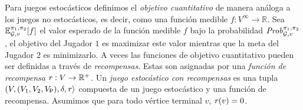 
Para juegos estocásticos definimos el \emph{objetivo cuantitativo} de manera análoga a los juegos no estocásticos, es decir, como una función medible $f: V^{\infty} \to \mathbb{R}$.   Sea $\mathbb{E}^{\pi_{1}, \pi_{2}}_{\mathcal{G},v}[f]$ el valor esperado de la función medible $f$ bajo la probabilidad $\mathit{Prob}^{\pi_{1}, \pi_{2}}_{\mathcal{G},v}$, el objetivo del Jugador $1$ es maximizar este valor mientras que la meta del Jugador $2$ es minimizarlo.  A veces las funciones de objetivo cuantitativo pueden ser definidas a través de \emph{recompensas}. Estas son asignadas por una \emph{función de recompensa} $\mathit{r}:V \to \mathbb{R}^+$. Un \emph{juego estocástico con recompensas} es una tupla $(V, (V_1, V_2, V_{\mathsf{P}}), \delta, \mathit{r} \rangle$ compuesta de un juego estocástico y una función de recompensa. Asumimos que para todo vértice terminal $v$,  $\mathit{r}(v) = 0$.

